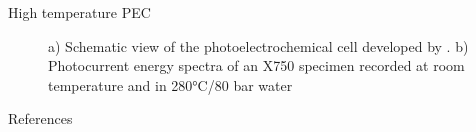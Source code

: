 \documentclass[10pt,compress]{beamer}
\begin{document}
\begin{frame}[allowframebreaks=1.0]{High temperature PEC}
\begin{figure}[h]
            \caption{a) Schematic view of the photoelectrochemical cell developed by \citet{skocic2016}. 
            b) Photocurrent energy spectra of an X750 specimen recorded at room
            temperature and in 280°C/80 bar water \citep{skocic2016}}
            \label{fig_skocic_phd}
        \end{figure}
    \end{frame}




\begin{frame}[allowframebreaks=0.9]{References}
\AtNextBibliography{\tiny}
\nocite{*}
\printbibliography
\end{frame}
\end{document}
